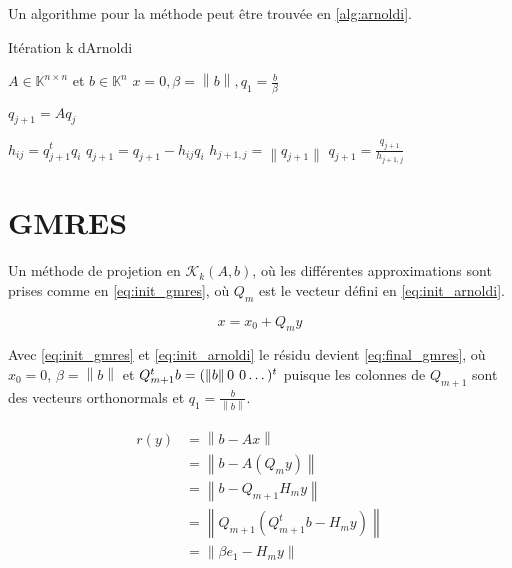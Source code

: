 \documentclass[a4paper, 15pt]{report}
\newcommand{\norm}[1]{\left\lVert#1\right\rVert}
\begin{document}
    Un algorithme pour la méthode peut être trouvée en \ref{alg:arnoldi}.

     \begin{algorithm}
    \caption{Itération k dArnoldi}\label{alg:arnoldi}
    \begin{algorithmic}[1]
    \State $A \in \mathbb{K}^{n \times n}$ et $b\in \mathbb{K}^{n}$
    \State $x=0, \beta=\norm{b},q_{1}=\frac{b}{\beta}$
    
    \State $q_{j+1} = Aq_{j}$

    \State $h_{ij}= q_{j+1}^{t}q_{i}$
    \State $q_{j+1} = q_{j+1} - h_{ij}q_{i}$
    \EndFor
    \State $h_{j+1,j}=\norm{q_{j+1}}$
    \State $q_{j+1} = \frac{q_{j+1}}{h_{j+1,j}}$
    \EndFor
    
    \end{algorithmic}
    \end{algorithm}


    
    \chapter{GMRES}

    Un méthode de projetion en $\mathcal{K}_{k}(A,b)$, où les différentes approximations sont prises comme en \ref{eq:init_gmres}, où $Q_{m}$ est le vecteur défini en \ref{eq:init_arnoldi}.

    \begin{equation}\label{eq:init_gmres}
        x = x_{0} + Q_{m}y
    \end{equation}

    Avec \ref{eq:init_gmres} et \ref{eq:init_arnoldi} le résidu devient \ref{eq:final_gmres}, où $x_{0} = 0$, $\beta=\norm{b}$ et $Q_{m+1}^{t}b=(\norm{b} 0 \hspace{0.05in} 0\dots)^{t}$ puisque les colonnes de $Q_{m+1}$ sont des vecteurs orthonormals et $q_{1} = \frac{b}{\norm{b}}$. 

    \begin{align} \label{eq:final_gmres}
    \begin{split}
        r(y) &= \norm{b - Ax}\\ 
        &= \norm{b - A(Q_{m}y)}\\ 
        &= \norm{b-Q_{m+1}H_{m}y} \\
        &= \norm{Q_{m+1}(Q_{m+1}^{t}b-H_{m}y)} \\
        &= \norm{\beta e_{1} - H_{m}y}
    \end{split}
    \end{align}
\end{document}

